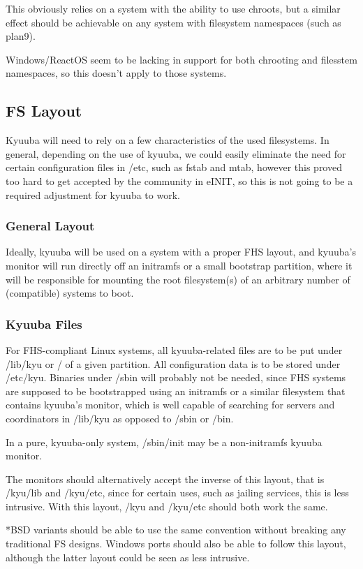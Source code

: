 \documentclass[a4paper,twoside,titlepage]{article}
\begin{document}
This obviously relies on a system with the ability to use chroots, but a similar
effect should be achievable on any system with filesystem namespaces (such as
plan9).

Windows/ReactOS seem to be lacking in support for both chrooting and filesstem
namespaces, so this doesn't apply to those systems.

\subsection{FS Layout}
Kyuuba will need to rely on a few characteristics of the used filesystems. In
general, depending on the use of kyuuba, we could easily eliminate the need for
certain configuration files in /etc, such as fstab and mtab, however this proved
too hard to get accepted by the community in eINIT, so this is not going to be a
required adjustment for kyuuba to work.

\subsubsection{General Layout}
Ideally, kyuuba will be used on a system with a proper FHS layout, and kyuuba's
monitor will run directly off an initramfs or a small bootstrap partition, where
it will be responsible for mounting the root filesystem(s) of an arbitrary
number of (compatible) systems to boot.

\subsubsection{Kyuuba Files}
For FHS-compliant Linux systems, all kyuuba-related files are to be put under
/lib/kyu or / of a given partition. All configuration data is to be stored under
/etc/kyu. Binaries under /sbin will probably not be needed, since FHS systems
are supposed to be bootstrapped using an initramfs or a similar filesystem that
contains kyuuba's monitor, which is well capable of searching for servers and
coordinators in /lib/kyu as opposed to /sbin or /bin.

In a pure, kyuuba-only system, /sbin/init may be a non-initramfs kyuuba monitor.

The monitors should alternatively accept the inverse of this layout, that is
/kyu/lib and /kyu/etc, since for certain uses, such as jailing services, this is
less intrusive. With this layout, /kyu and /kyu/etc should both work the same.

*BSD variants should be able to use the same convention without breaking any
traditional FS designs. Windows ports should also be able to follow this layout,
although the latter layout could be seen as less intrusive.
\end{document}
